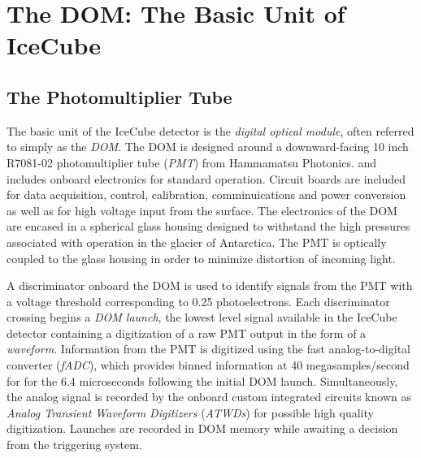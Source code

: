 \section{The DOM: The Basic Unit of IceCube}

\label{subsec:pmt}
\subsection{The Photomultiplier Tube}
The basic unit of the IceCube detector is the \emph{digital optical module}, often referred to simply as the \emph{DOM}.
The DOM is designed around a downward-facing 10 inch R7081-02 photomultiplier tube (\emph{PMT}) from Hammamatsu Photonics.  and includes onboard electronics for standard operation. 
Circuit boards are included for data acquisition, control, calibration, comminuications and power conversion as well as for high voltage input from the surface.
The electronics of the DOM are encased in a spherical glass housing designed to withstand the high pressures associated with operation in the glacier of Antarctica.
The PMT is optically coupled to the glass housing in order to minimize distortion of incoming light. 



A discriminator onboard the DOM is used to identify signals from the PMT with a voltage threshold corresponding to 0.25 photoelectrons.
Each discriminator crossing begins a \emph{DOM launch}, the lowest level signal available in the IceCube detector containing a digitization of a raw PMT output in the form of a \emph{waveform}.
Information from the PMT is digitized using the fast analog-to-digital converter (\emph{fADC}), which provides binned information at 40 megasamples/second for for the 6.4 microseconds following the initial DOM launch.
Simultaneously, the analog signal is recorded by the onboard custom integrated circuits known as \emph{Analog Transient Waveform Digitizers} (\emph{ATWDs}) for possible high quality digitization.
Launches are recorded in DOM memory while awaiting a decision from the triggering system.

